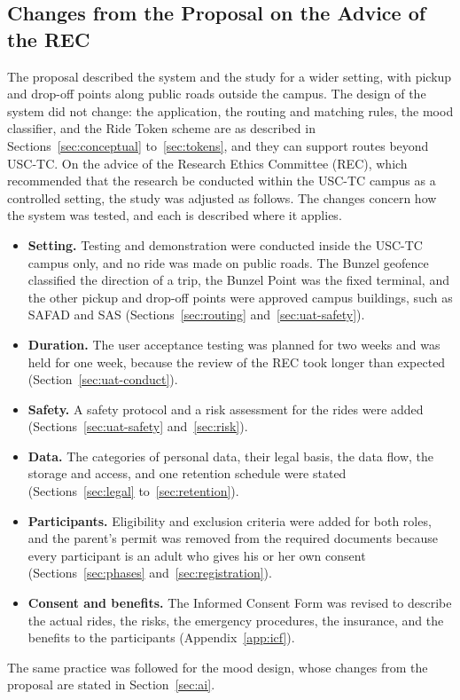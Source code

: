 \subsection[Changes from the Proposal on the Advice of the REC]{Changes from the Proposal on the Advice of the REC}\label{sec:rec-changes}
The proposal described the system and the study for a wider setting, with pickup and drop-off points along public roads outside the campus. The design of the system did not change: the application, the routing and matching rules, the mood classifier, and the Ride Token scheme are as described in Sections~\ref{sec:conceptual} to~\ref{sec:tokens}, and they can support routes beyond USC-TC. On the advice of the Research Ethics Committee (REC), which recommended that the research be conducted within the USC-TC campus as a controlled setting, the study was adjusted as follows. The changes concern how the system was tested, and each is described where it applies.
\begin{itemize}
    \item \textbf{Setting.} Testing and demonstration were conducted inside the USC-TC campus only, and no ride was made on public roads. The Bunzel geofence classified the direction of a trip, the Bunzel Point was the fixed terminal, and the other pickup and drop-off points were approved campus buildings, such as SAFAD and SAS (Sections~\ref{sec:routing} and~\ref{sec:uat-safety}).
    \item \textbf{Duration.} The user acceptance testing was planned for two weeks and was held for one week, because the review of the REC took longer than expected (Section~\ref{sec:uat-conduct}).
    \item \textbf{Safety.} A safety protocol and a risk assessment for the rides were added (Sections~\ref{sec:uat-safety} and~\ref{sec:risk}).
    \item \textbf{Data.} The categories of personal data, their legal basis, the data flow, the storage and access, and one retention schedule were stated (Sections~\ref{sec:legal} to~\ref{sec:retention}).
    \item \textbf{Participants.} Eligibility and exclusion criteria were added for both roles, and the parent's permit was removed from the required documents because every participant is an adult who gives his or her own consent (Sections~\ref{sec:phases} and~\ref{sec:registration}).
    \item \textbf{Consent and benefits.} The Informed Consent Form was revised to describe the actual rides, the risks, the emergency procedures, the insurance, and the benefits to the participants (Appendix~\ref{app:icf}).
\end{itemize}
The same practice was followed for the mood design, whose changes from the proposal are stated in Section~\ref{sec:ai}.

